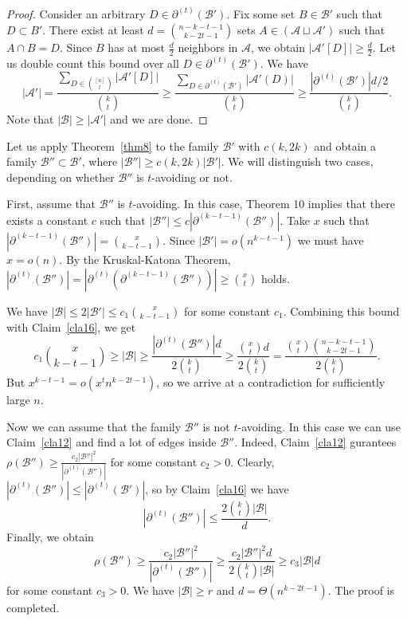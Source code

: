 \documentclass[12pt,a4paper]{article}
\newcommand{\cA}{\mathcal{A}}
\newcommand{\bb}{\mathcal{B}}
\begin{document}
\begin{proof}
    Consider an arbitrary $D \in \partial^{(t)}(\mathcal{B'})$. Fix some set $B \in \mathcal{B'}$ such that $D \subset B'$. There exist at least $d=\binom{n-k-t-1}{k-2t-1}$ sets $A \in (\cA \sqcup \cA')$ such that $A \cap B = D$. Since $B$ has at most $\frac{d}{2}$ neighbors in $\cA$, we obtain $|\cA'[D]| \geqslant \frac{d}{2}$. Let us double count this bound over all $D \in \partial^{(t)}(\mathcal{B'})$. We have
$$ |\mathcal{A}'| = \frac{\sum_{D \in \binom{[n]}{t}}|\cA'[D]|}{\binom{k}{t}} \geqslant \frac{\sum_{D \in \partial^{(t)}(\mathcal{B'})}|\cA'(D)|}{\binom{k}{t}} \geqslant \frac{|\partial^{(t)}(\mathcal{B'})|d/2}{\binom{k}{t}}.$$
Note that $|\bb| \geqslant |\cA'|$ and we are done.
\end{proof}

Let us apply Theorem~\ref{thm8} to the family $\bb'$ with $c(k,2k)$ and obtain a family $\bb'' \subset \bb'$, where $|\bb''| \geqslant c(k,2k)|\bb'|$. We will distinguish two cases, depending on whether $\bb''$ is $t$-avoiding or not.


First, assume that $\bb''$ is $t$-avoiding. In this case, Theorem 10 implies that there exists a constant $c$ such that $|\bb''| \leqslant  c|\partial^{(k-t-1)}(\bb'')|.$ Take $x$ such that $|\partial^{(k-t-1)}(\mathcal{B''})| = \binom{x}{k-t-1}.$ Since $|\bb'| =o(n^{k-t-1})$ we must have  $x=o(n)$. By the Kruskal-Katona Theorem, $|\partial^{(t)}(\mathcal{B''})| = |\partial^{(t)}(\partial^{(k-t-1)}(\mathcal{B''}))| \geqslant \binom{x}{t}$ holds.

We have $|\bb| \leqslant 2|\bb'| \leqslant c_1 \binom{x}{k-t-1}$ for some constant $c_1$. Combining this bound with Claim~\ref{cla16}, we get 
$$ c_1 \binom{x}{k-t-1} \geqslant |\bb| \geqslant \frac{|\partial^{(t)}(\mathcal{B''})|d}{2\binom{k}{t}} \geqslant  \frac{\binom{x}{t}d}{2\binom{k}{t}} =\frac{\binom{x}{t}\binom{n-k-t-1}{k-2t-1}}{2\binom{k}{t}}.$$
But $x^{k-t-1}=o(x^tn^{k-2t-1})$, so we arrive at a contradiction for sufficiently large $n$.

Now we can assume that the family $\bb''$ is not $t$-avoiding. In this case we can use Claim~\ref{cla12} and find a lot of edges inside $\bb''$. Indeed, Claim~\ref{cla12} gurantees  $\rho(\bb'') \geqslant \frac{c_2|\bb''|^2}{|\partial^{(t)}(\bb'')|}$ for some constant $c_2 > 0$. Clearly, $|\partial^{(t)}(\bb'')| \leqslant |\partial^{(t)}(\bb')|$, so by Claim~\ref{cla16} we have $$|\partial^{(t)}(\bb'')| \leqslant \frac{2\binom{k}{t}|\bb|}{d}.$$
Finally, we obtain
$$\rho(\bb'') \geqslant \frac{c_2|\bb''|^2}{|\partial^{(t)}(\bb'')|} \geqslant  \frac{c_2|\bb''|^2d}{2\binom{k}{t}|\bb|} \geqslant c_3|\bb|d$$
for some constant $c_3>0$. We have $|\bb| \geqslant r$ and $d=\Theta(n^{k-2t-1})$. The proof is completed.
\end{document}
